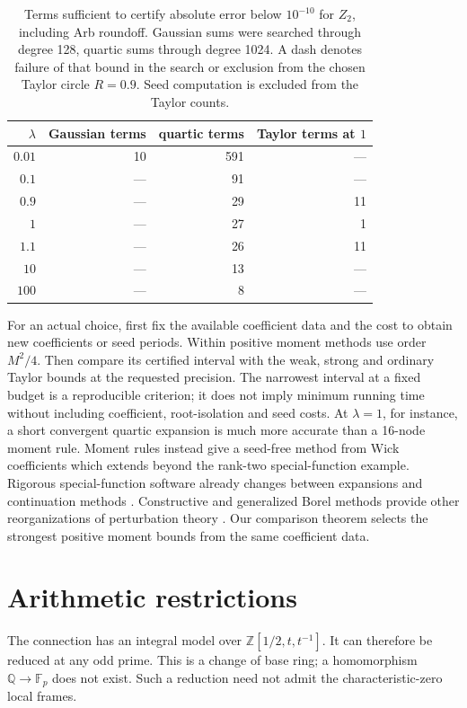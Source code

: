 \documentclass[11pt]{article}
\theoremstyle{definition}
\newcommand{\Q}{\mathbb Q}
\numberwithin{equation}{section}
\begin{document}
\begin{table}[ht]
\centering
\begin{tabular}{rrrr}
\toprule
$\lambda$ & Gaussian terms & quartic terms & Taylor terms at $1$\\
\midrule
$0.01$ & 10 & 591 & ---\\
$0.1$ & --- & 91 & ---\\
$0.9$ & --- & 29 & 11\\
$1$ & --- & 27 & 1\\
$1.1$ & --- & 26 & 11\\
$10$ & --- & 13 & ---\\
$100$ & --- & 8 & ---\\
\bottomrule
\end{tabular}
\caption{Terms sufficient to certify absolute error below $10^{-10}$
for $Z_2$, including Arb roundoff. Gaussian sums were searched through
degree 128, quartic sums through degree 1024. A dash denotes failure of
that bound in the search or exclusion from the chosen Taylor circle
$R=0.9$. Seed computation is excluded from the Taylor counts.}
\label{tab:charts}
\end{table}

For an actual choice, first fix the available coefficient data and the
cost to obtain new coefficients or seed periods. Within positive moment
methods use order $M^2/4$. Then compare its certified interval with
the weak, strong and ordinary Taylor bounds at the requested precision.
The narrowest interval at a fixed budget is a reproducible criterion;
it does not imply minimum running time without including coefficient,
root-isolation and seed costs. At $\lambda=1$, for instance, a short
convergent quartic expansion is much more accurate than a 16-node moment
rule. Moment rules instead give a seed-free method from Wick coefficients
which extends beyond the rank-two special-function example.
Rigorous special-function software already changes between expansions
and continuation methods \cite{Johansson}. Constructive and generalized
Borel methods provide other reorganizations of perturbation
theory \cite{Rivasseau,Mera}. Our comparison theorem selects the
strongest positive moment bounds from the same coefficient data.

\section{Arithmetic restrictions}
The connection has an integral model over
$\mathbb Z[1/2,t,t^{-1}]$. It can therefore be reduced at any odd prime.
This is a change of base ring; a homomorphism $\Q\to\mathbb F_p$ does
not exist. Such a reduction need not admit the characteristic-zero local
frames.
\end{document}
